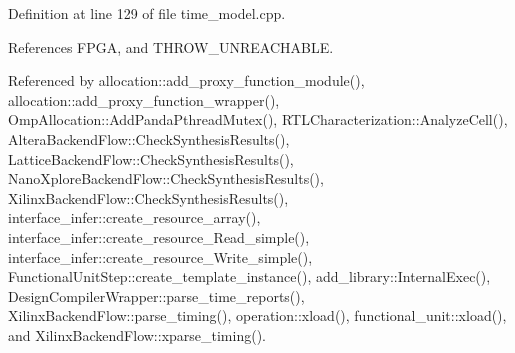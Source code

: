 Definition at line 129 of file time\+\_\+model.\+cpp.



References F\+P\+GA, and T\+H\+R\+O\+W\+\_\+\+U\+N\+R\+E\+A\+C\+H\+A\+B\+LE.



Referenced by allocation\+::add\+\_\+proxy\+\_\+function\+\_\+module(), allocation\+::add\+\_\+proxy\+\_\+function\+\_\+wrapper(), Omp\+Allocation\+::\+Add\+Panda\+Pthread\+Mutex(), R\+T\+L\+Characterization\+::\+Analyze\+Cell(), Altera\+Backend\+Flow\+::\+Check\+Synthesis\+Results(), Lattice\+Backend\+Flow\+::\+Check\+Synthesis\+Results(), Nano\+Xplore\+Backend\+Flow\+::\+Check\+Synthesis\+Results(), Xilinx\+Backend\+Flow\+::\+Check\+Synthesis\+Results(), interface\+\_\+infer\+::create\+\_\+resource\+\_\+array(), interface\+\_\+infer\+::create\+\_\+resource\+\_\+\+Read\+\_\+simple(), interface\+\_\+infer\+::create\+\_\+resource\+\_\+\+Write\+\_\+simple(), Functional\+Unit\+Step\+::create\+\_\+template\+\_\+instance(), add\+\_\+library\+::\+Internal\+Exec(), Design\+Compiler\+Wrapper\+::parse\+\_\+time\+\_\+reports(), Xilinx\+Backend\+Flow\+::parse\+\_\+timing(), operation\+::xload(), functional\+\_\+unit\+::xload(), and Xilinx\+Backend\+Flow\+::xparse\+\_\+timing().

